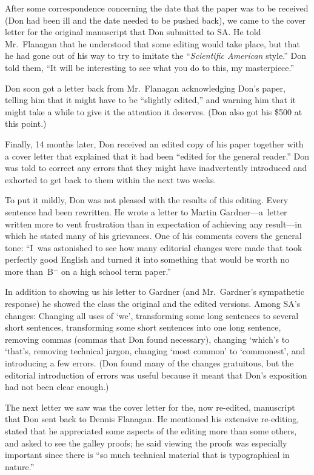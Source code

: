 After some correspondence concerning the date that the paper was to be
received (Don had been ill and the date needed to be pushed back), we came
to the cover letter for the original manuscript that Don submitted to SA.
He told Mr.~Flanagan that he understood that some editing would take
place, but that he had gone out of his way to try to imitate the
``{\sl Scientific American\/} style.''  Don told them, ``It will be interesting to
see what you do to this, my masterpiece.''

Don soon got a letter back from Mr.~Flanagan acknowledging Don's paper,
telling him that it might have to be ``slightly edited,'' and warning him that
it might take a while to give it the attention it deserves. (Don also got his
\$500 at this point.)  

Finally, 14 months later, Don 
received an edited copy of his paper together with a cover letter that
explained that it had been ``edited for the general reader.''  Don
was told to correct any errors that they might have inadvertently
introduced and exhorted to get back to them within the next two weeks.

To put it mildly, Don was not pleased with the results of this editing.
Every sentence had been rewritten.
He wrote a letter to Martin Gardner---a~letter
written more to vent frustration than in expectation of achieving any
result---in which he stated many of his grievances.  One of his comments
covers the general tone: ``I~was astonished to see how many editorial
changes were made that took perfectly good English and turned it into
something that would be worth no more than~B$^-$ on a high school term paper.''

In addition to showing us his letter to Gardner (and Mr.~Gardner's
sympathetic response) he showed the class the original and the edited
versions.  Among SA's changes: Changing all uses of `we',
transforming some long sentences to several short sentences,
transforming some short sentences into one long sentence, removing commas
(commas that Don found necessary), changing `which's to `that's, removing
technical jargon, changing `most common' to `commonest', and introducing a
few errors. (Don found many of the changes gratuitous, but the editorial
introduction of errors was useful because it meant that Don's exposition
had not been clear enough.)

The next letter we saw was the cover letter for the, now re-edited,
manuscript that Don sent back to Dennis Flanagan.  He mentioned his
extensive re-editing, stated that he appreciated some aspects of the
editing more than some others, and asked to see the galley proofs; he
said viewing the proofs was especially important since there is ``so much
technical material that is typographical in nature.''

